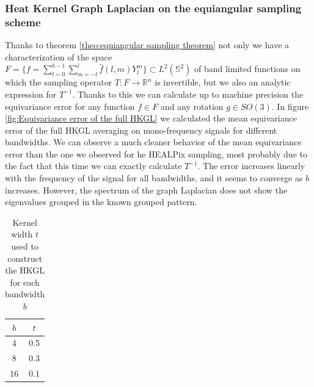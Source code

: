 \subsubsection{Heat Kernel Graph Laplacian on the equiangular sampling scheme}
Thanks to theorem \ref{theo:equiangular sampling theorem} not only we have a characterization of the space \\$F=\{f=\sum_{l=0}^{b-1} \sum_{m=-l}^{l} \widehat{f}(l, m) Y_{l}^{m}\}\subset L^2(\mathbb  S^2)$ of band limited functions on which the sampling operator $T: F\to \mathbb R^n$ is invertible, but we also an analytic expression for $T^{-1}$. Thanks to this we can calculate up to machine precision the equivariance error for any function $f\in F$ and any rotation $g\in SO(3)$. In figure \ref{fig:Equivariance error of the full HKGL} we calculated the mean equivariance error of the full HKGL averaging on mono-frequency signals for different bandwidths. We can observe a much cleaner behavior of the mean equivariance error than the one we observed for he HEALPix sampling, most probably due to the fact that this time we can exactly calculate $T^{-1}$. The error increases linearly with the frequency of the signal for all bandwidths, and it seems to converge as $b$ increases. However, the spectrum of the graph Laplacian does not show the eigenvalues grouped in the known grouped pattern.
\begin{table}[h!]
	\centering
	\begin{tabular}{ c|c } 
$b$ & $t$ \\ 
	\hline
4 & 0.5 \\ 
8 & 0.3 \\ 
16 & 0.1 \\ 
	\end{tabular}
	\caption{\label{table:equiangular kernel width}Kernel width $t$ used to construct the HKGL for each bandwidth $b$}
\end{table}

